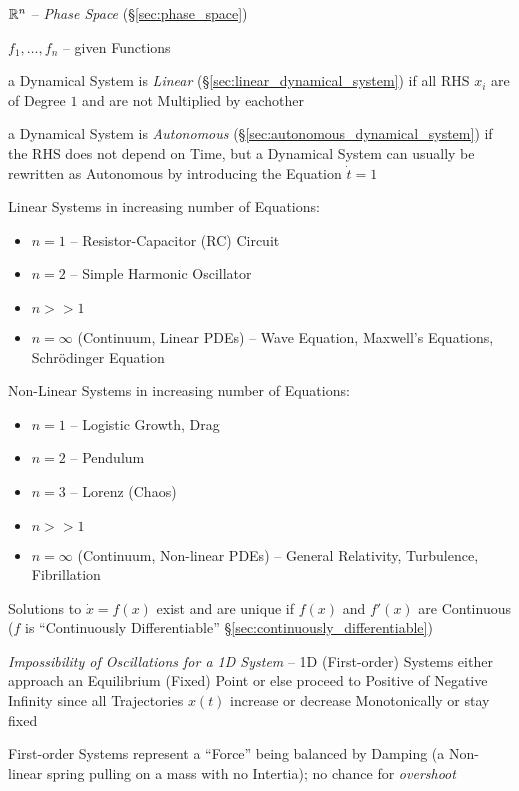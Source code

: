 $\mathbb{R}^n$ -- \emph{Phase Space} (\S\ref{sec:phase_space})

$f_1, \ldots, f_n$ -- given Functions

a Dynamical System is \emph{Linear} (\S\ref{sec:linear_dynamical_system}) if
all RHS $x_i$ are of Degree $1$ and are not Multiplied by eachother

a Dynamical System is \emph{Autonomous}
(\S\ref{sec:autonomous_dynamical_system}) if the RHS does not depend on Time,
but a Dynamical System can usually be rewritten as Autonomous by introducing
the Equation $\dot{t} = 1$

Linear Systems in increasing number of Equations:
\begin{itemize}
  \item $n = 1$ -- Resistor-Capacitor (RC) Circuit
  \item $n = 2$ -- Simple Harmonic Oscillator
  \item $n >> 1$
  \item $n = \infty$ (Continuum, Linear PDEs) -- Wave Equation, Maxwell's
    Equations, Schr\"odinger Equation
\end{itemize}

Non-Linear Systems in increasing number of Equations:
\begin{itemize}
  \item $n = 1$ -- Logistic Growth, Drag
  \item $n = 2$ -- Pendulum
  \item $n = 3$ -- Lorenz (Chaos)
  \item $n >> 1$
  \item $n = \infty$ (Continuum, Non-linear PDEs) -- General Relativity,
    Turbulence, Fibrillation
\end{itemize}

Solutions to $\dot{x} = f(x)$ exist and are unique if $f(x)$ and $f'(x)$ are
Continuous ($f$ is ``Continuously Differentiable''
\S\ref{sec:continuously_differentiable})

\emph{Impossibility of Oscillations for a 1D System} -- 1D (First-order)
Systems either approach an Equilibrium (Fixed) Point or else proceed to
Positive of Negative Infinity since all Trajectories $x(t)$ increase or
decrease Monotonically or stay fixed

First-order Systems represent a ``Force'' being balanced by Damping (a
Non-linear spring pulling on a mass with no Intertia); no chance for
\emph{overshoot}



